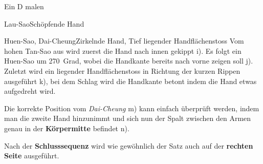 \begin{WTSatz}{Ein D malen}
\begin{WTSatzTeil}{Lau-Sao}{Sch\"opfende Hand}
		
		
	\end{WTSatzTeil}
	\begin{WTSatzTeil}{Huen-Sao, Dai-Cheung}{Zirkelnde Hand, Tief liegender Handfl\"achenstoss}
		Vom hohen Tan-Sao aus wird zuerst die Hand nach innen gekippt i). Es folgt ein Huen-Sao um 270~Grad, wobei die Handkante bereits nach vorne zeigen soll j). Zuletzt wird ein liegender Handfl\"achenstoss in Richtung der kurzen Rippen ausgef\"uhrt k), bei dem Schlag wird die Handkante betont indem die Hand etwas aufgedreht wird.
		
		\begin{WTCommonNoob}
			
			Die korrekte Position vom \textit{Dai-Cheung} m) kann einfach \"uberpr\"uft werden, indem man die zweite Hand hinzunimmt und sich nun der Spalt zwischen den Armen genau in der \textbf{K\"orpermitte} befindet n).
		\end{WTCommonNoob}
		
		Nach der \textbf{Schlusssequenz} wird wie gew\"ohnlich der Satz auch auf der \textbf{rechten Seite} ausgef\"uhrt.
		
	\end{WTSatzTeil}
\end{WTSatz}


